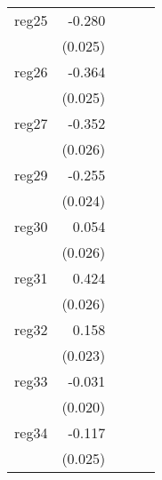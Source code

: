 {\begin{longtable}{l*{4}{D{.}{.}{-1}}}
\addlinespace
reg25       &      -0.280\sym{***}&                     &                     &                     \\
            &     (0.025)         &                     &                     &                     \\
\addlinespace
reg26       &      -0.364\sym{***}&                     &                     &                     \\
            &     (0.025)         &                     &                     &                     \\
\addlinespace
reg27       &      -0.352\sym{***}&                     &                     &                     \\
            &     (0.026)         &                     &                     &                     \\
\addlinespace
reg29       &      -0.255\sym{***}&                     &                     &                     \\
            &     (0.024)         &                     &                     &                     \\
\addlinespace
reg30       &       0.054\sym{*}  &                     &                     &                     \\
            &     (0.026)         &                     &                     &                     \\
\addlinespace
reg31       &       0.424\sym{***}&                     &                     &                     \\
            &     (0.026)         &                     &                     &                     \\
\addlinespace
reg32       &       0.158\sym{***}&                     &                     &                     \\
            &     (0.023)         &                     &                     &                     \\
\addlinespace
reg33       &      -0.031         &                     &                     &                     \\
            &     (0.020)         &                     &                     &                     \\
\addlinespace
reg34       &      -0.117\sym{***}&                     &                     &                     \\
            &     (0.025)         &                     &                     &                     \\

\end{longtable}}
